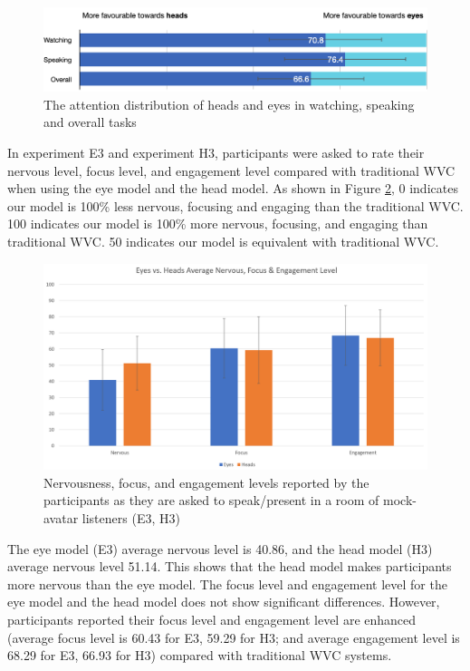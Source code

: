 \begin{figure}
	\centering
 	\includegraphics[width=\textwidth]{Result_F4.png}
	\caption{The attention distribution of heads and eyes in watching, speaking and overall tasks}
	\label{fig:e1-eye-vs-head}
\end{figure}

In experiment E3 and experiment H3, participants were asked to rate their nervous level, focus level, and engagement level compared with traditional WVC when using the eye model and the head model. As shown in Figure \ref{fig:e3h3}, 0 indicates our model is 100\% less nervous, focusing and engaging than the traditional WVC. 100 indicates our model is 100\% more nervous, focusing, and engaging than traditional WVC. 50 indicates our model is equivalent with traditional WVC. 

\begin{figure}
	\centering
 	\includegraphics[width=\textwidth]{Result_F3.PNG}
	\caption{Nervousness, focus, and engagement levels reported by the participants as they are asked to speak/present in a room of mock-avatar listeners (E3, H3)}
	\label{fig:e3h3}
\end{figure}

The eye model (E3) average nervous level  is 40.86, and the head model (H3) average nervous level 51.14. This shows that the head model makes participants more nervous than the eye model. The focus level and engagement level for the eye model and the head model does not show significant differences. However, participants reported their focus level and engagement level are enhanced (average focus level is 60.43 for E3, 59.29 for H3; and average engagement level is 68.29 for E3, 66.93 for H3) compared with traditional WVC systems. 


